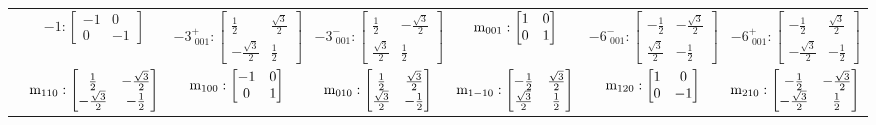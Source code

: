 \documentclass[fleqn,8pt,landscape]{jsarticle}
\begin{document}
\begin{longtable}{ccccccc}
& $ -1:\begin{bmatrix} -1 & 0 \\ 0 & -1 \end{bmatrix} $ & $ -3^{+}_{\,\,001}:\begin{bmatrix} \frac{1}{2} & \frac{\sqrt{3}}{2} \\ - \frac{\sqrt{3}}{2} & \frac{1}{2} \end{bmatrix} $ & $ -3^{-}_{\,\,001}:\begin{bmatrix} \frac{1}{2} & - \frac{\sqrt{3}}{2} \\ \frac{\sqrt{3}}{2} & \frac{1}{2} \end{bmatrix} $ & $ {\rm m}_{001}:\begin{bmatrix} 1 & 0 \\ 0 & 1 \end{bmatrix} $ & $ -6^{-}_{\,\,001}:\begin{bmatrix} - \frac{1}{2} & - \frac{\sqrt{3}}{2} \\ \frac{\sqrt{3}}{2} & - \frac{1}{2} \end{bmatrix} $ & $ -6^{+}_{\,\,001}:\begin{bmatrix} - \frac{1}{2} & \frac{\sqrt{3}}{2} \\ - \frac{\sqrt{3}}{2} & - \frac{1}{2} \end{bmatrix} $ \\
& $ {\rm m}_{110}:\begin{bmatrix} \frac{1}{2} & - \frac{\sqrt{3}}{2} \\ - \frac{\sqrt{3}}{2} & - \frac{1}{2} \end{bmatrix} $ & $ {\rm m}_{100}:\begin{bmatrix} -1 & 0 \\ 0 & 1 \end{bmatrix} $ & $ {\rm m}_{010}:\begin{bmatrix} \frac{1}{2} & \frac{\sqrt{3}}{2} \\ \frac{\sqrt{3}}{2} & - \frac{1}{2} \end{bmatrix} $ & $ {\rm m}_{1-10}:\begin{bmatrix} - \frac{1}{2} & \frac{\sqrt{3}}{2} \\ \frac{\sqrt{3}}{2} & \frac{1}{2} \end{bmatrix} $ & $ {\rm m}_{120}:\begin{bmatrix} 1 & 0 \\ 0 & -1 \end{bmatrix} $ & $ {\rm m}_{210}:\begin{bmatrix} - \frac{1}{2} & - \frac{\sqrt{3}}{2} \\ - \frac{\sqrt{3}}{2} & \frac{1}{2} \end{bmatrix} $ \\ \hline

\end{longtable}
\end{document}
